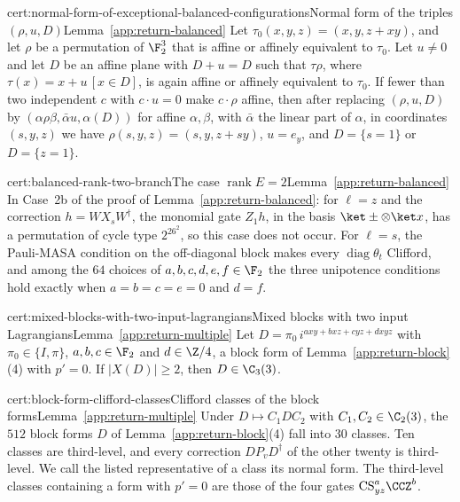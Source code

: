 \begin{finitefact}{cert:normal-form-of-exceptional-balanced-configurations}{Normal form of the triples $(\rho,u,D)$}{Lemma~\ref{app:return-balanced}}
Let $\tau_0(x,y,z)=(x,y,z+xy)$, and let $\rho$ be a permutation of $\F_2^3$ that is affine or affinely equivalent to $\tau_0$. Let $u\ne0$ and let $D$ be an affine plane with $D+u=D$ such that $\tau\rho$, where $\tau(x)=x+u\,[x\in D]$, is again affine or affinely equivalent to $\tau_0$. If fewer than two independent $c$ with $c\cdot u=0$ make $c\cdot\rho$ affine, then after replacing $(\rho,u,D)$ by $(\alpha\rho\beta,\bar\alpha u,\alpha(D))$ for affine $\alpha,\beta$, with $\bar\alpha$ the linear part of $\alpha$, in coordinates $(s,y,z)$ we have $\rho(s,y,z)=(s,y,z+sy)$, $u=e_y$, and $D=\{s=1\}$ or $D=\{z=1\}$.
\end{finitefact}

\begin{finitefact}{cert:balanced-rank-two-branch}{The case $\operatorname{rank}E=2$}{Lemma~\ref{app:return-balanced}}
In Case~2b of the proof of Lemma~\ref{app:return-balanced}: for $\ell=z$ and the correction $h=WX_sW^\dagger$, the monomial gate $Z_1h$, in the basis $\ket\pm\otimes\ket x$, has a permutation of cycle type $2^26^2$, so this case does not occur. For $\ell=s$, the Pauli-MASA condition on the off-diagonal block makes every $\operatorname{diag}\theta_t$ Clifford, and among the $64$ choices of $a,b,c,d,e,f\in\F_2$ the three unipotence conditions hold exactly when $a=b=c=e=0$ and $d=f$.
\end{finitefact}

\begin{finitefact}{cert:mixed-blocks-with-two-input-lagrangians}{Mixed blocks with two input Lagrangians}{Lemma~\ref{app:return-multiple}}
Let $D=\pi_0\,i^{axy+bxz+cyz+dxyz}$ with $\pi_0\in\{I,\pi\}$, $a,b,c\in\F_2$ and $d\in\Z/4$, a block form of Lemma~\ref{app:return-block}\textup{(4)} with $p'=0$. If $|X(D)|\ge2$, then $D\in\C_3(3)$.
\end{finitefact}

\begin{finitefact}{cert:block-form-clifford-classes}{Clifford classes of the block forms}{Lemma~\ref{app:return-multiple}}
Under $D\mapsto C_1DC_2$ with $C_1,C_2\in\C_2(3)$, the $512$ block forms $D$ of Lemma~\ref{app:return-block}\textup{(4)} fall into $30$ classes. Ten classes are third-level, and every correction $DP_vD^\dagger$ of the other twenty is third-level. We call the listed representative of a class its normal form. The third-level classes containing a form with $p'=0$ are those of the four gates $\mathrm{CS}_{yz}^a\CCZ^b$.
\end{finitefact}

